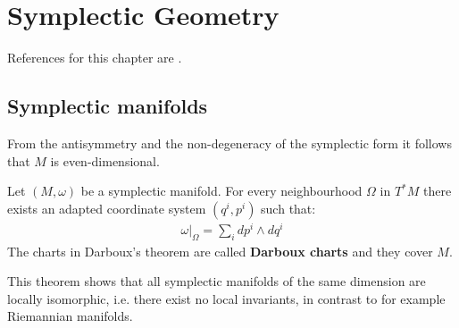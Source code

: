 \chapter{Symplectic Geometry}\label{chapter:symplectic}

	References for this chapter are \cite{mcduff, symplectic}.

\section{Symplectic manifolds}

	
	\begin{property}[Dimension]
		From the antisymmetry and the non-degeneracy of the symplectic form it follows that $M$ is even-dimensional.
	\end{property}
	
	\begin{theorem}[Darboux]
		Let $(M, \omega)$ be a symplectic manifold. For every neighbourhood $\Omega$ in $T^*M$ there exists an adapted coordinate system $(q^i, p^i)$ such that:
		\begin{gather}
			\left.\omega\right|_\Omega = \sum_idp^i\wedge dq^i
		\end{gather}		
		{\normalfont The charts in Darboux's theorem are called \textbf{Darboux charts} and they cover $M$.}
	\end{theorem}
	\begin{remark}
		This theorem shows that all symplectic manifolds of the same dimension are locally isomorphic, i.e. there exist no local invariants, in contrast to for example Riemannian manifolds.
	\end{remark}
	
